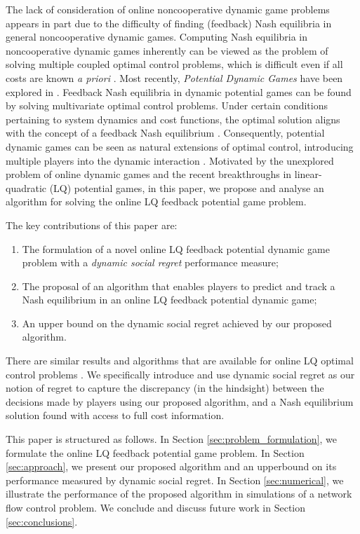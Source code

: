 \documentclass[letterpaper, 10 pt, conference]{ieeeconf}  %
\begin{document}
The lack of consideration of online noncooperative dynamic game problems appears in part due to the difficulty of finding (feedback) Nash equilibria in general noncooperative dynamic games.
Computing Nash equilibria in noncooperative dynamic games inherently can be viewed as the problem of solving multiple coupled optimal control problems, which is difficult even if all costs are known \emph{a priori} \cite{basar_dynamic_1998,engwerda_lq_2005}. 
{\color{red} Most recently, \emph{Potential Dynamic Games} have been explored in \cite{gonzalez-sanchez_discretetime_2013,jewaidu_rilwan_potential_2021}}.
Feedback Nash equilibria in dynamic potential games can be found by solving multivariate optimal control problems. 
Under certain conditions pertaining to system dynamics and cost functions, the optimal solution aligns with the concept of a feedback Nash equilibrium \cite[Section 4]{monderer_potential_1996}. 
Consequently, potential dynamic games can be seen as natural extensions of optimal control, introducing multiple players into the dynamic interaction \cite{prasad_structure_2023}. Motivated by the unexplored problem of online dynamic games and the recent breakthroughs in linear-quadratic (LQ) potential games, in this paper, we propose and analyse an algorithm for solving the online LQ feedback potential game problem.

The key contributions of this paper are:
\begin{enumerate}
    \item The formulation of a novel online LQ feedback potential dynamic game problem with a \emph{dynamic social regret} performance measure;
    \item The proposal of an algorithm that enables players to predict and track a Nash equilibrium in an online LQ feedback potential dynamic game;
    \item An upper bound on the dynamic social regret achieved by our proposed algorithm.
\end{enumerate}
There are similar results and algorithms that are available for online LQ optimal control problems \cite{abbasi-yadkori_regret_2011,chen_regret_2023,zhang_regret_2021}. 
We specifically introduce and use dynamic social regret as our notion of regret to capture the discrepancy (in the hindsight) between the decisions made by players using our proposed algorithm, and a Nash equilibrium solution found with access to full cost information.

This paper is structured as follows.
In Section \ref{sec:problem_formulation}, we formulate the online LQ feedback potential game problem. In Section \ref{sec:approach}, we present our proposed algorithm and an upperbound on its performance measured by dynamic social regret. In Section \ref{sec:numerical}, we illustrate the performance of the proposed algorithm in simulations of a network flow control problem. We conclude and discuss future work in Section \ref{sec:conclusions}.
\end{document}
